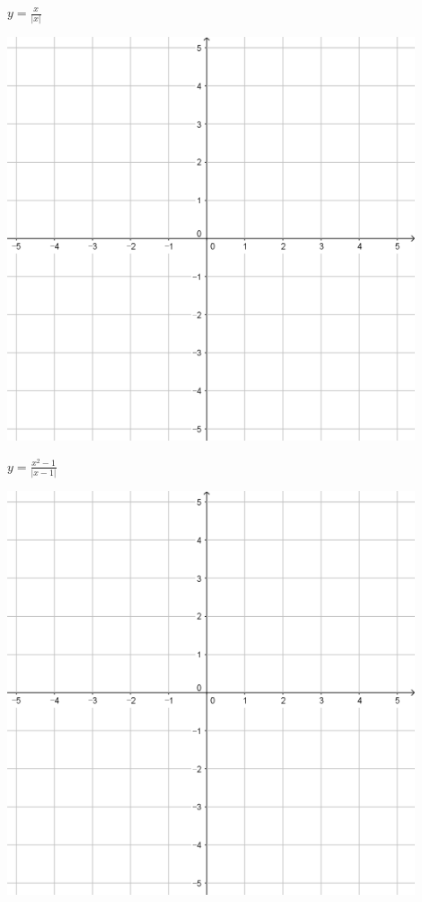 \documentclass{oblivoir}
\begin{document}
\begin{minipage}{0.45\textwidth}\centering
\(y=\frac{x}{|x|}\)
\par\bigskip\includegraphics[width=0.9\textwidth]{55}
\end{minipage}
\begin{minipage}{0.45\textwidth}\centering
\(y=\frac{x^2-1}{|x-1|}\)
\par\bigskip\includegraphics[width=0.9\textwidth]{55}
\end{minipage}\bigskip\bigskip\par
\end{document}
